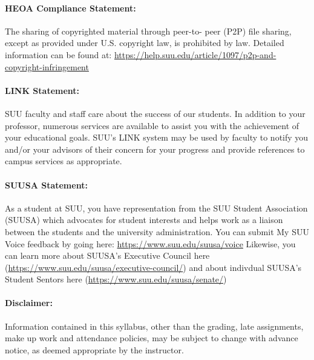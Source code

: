 \documentclass[12pt, letterpaper]{article}
\begin{document}
\paragraph{HEOA Compliance Statement:}
The sharing of copyrighted material through peer-to- peer (P2P) file sharing, except as provided under U.S. copyright law, is prohibited by law. Detailed information can be found at: \href{https://help.suu.edu/article/1097/p2p-and-copyright-infringement}{https://help.suu.edu/article/1097/p2p-and-copyright-infringement}

\paragraph{LINK Statement:}
SUU faculty and staff care about the success of our students. In addition to your professor, numerous services are available to assist you with the achievement of your educational goals. SUU's LINK system may be used by faculty to notify you and/or your advisors of their concern for your progress and provide references to campus services as appropriate.

\paragraph{SUUSA Statement:}
As a student at SUU, you have representation from the SUU Student Association (SUUSA) which advocates for student interests and helps work as a liaison between the students and the university administration. You can submit My SUU Voice feedback by going here: \href{https://www.suu.edu/suusa/voice}{https://www.suu.edu/suusa/voice} Likewise, you can learn more about SUUSA's Executive Council here (\href{https://www.suu.edu/suusa/executive-council/}{https://www.suu.edu/suusa/executive-council/}) and about indivdual SUUSA's Student Sentors here (\href{https://www.suu.edu/suusa/senate/}{https://www.suu.edu/suusa/senate/})

\paragraph{Disclaimer:}
Information contained in this syllabus, other than the grading, late assignments, make up work and attendance policies, may be subject to change with advance notice, as deemed appropriate by the instructor.
\end{document}

